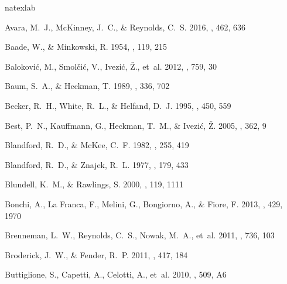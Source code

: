 \documentclass[preprint2,twocolappendix]{aastex6}
\begin{document}
\begin{thebibliography}{}
\expandafter\ifx\csname natexlab\endcsname\relax\def\natexlab#1{#1}\fi

{Avara}, M.~J., {McKinney}, J.~C., \& {Reynolds}, C.~S. 2016, \mnras, 462, 636

{Baade}, W., \& {Minkowski}, R. 1954, \apj, 119, 215

{Balokovi{\'c}}, M., {Smol{\v c}i{\'c}}, V., {Ivezi{\'c}}, {\v Z}., {et~al.}
  2012, \apj, 759, 30

{Baum}, S.~A., \& {Heckman}, T. 1989, \apj, 336, 702

{Becker}, R.~H., {White}, R.~L., \& {Helfand}, D.~J. 1995, \apj, 450, 559

{Best}, P.~N., {Kauffmann}, G., {Heckman}, T.~M., \& {Ivezi{\'c}}, {\v Z}.
  2005, \mnras, 362, 9

{Blandford}, R.~D., \& {McKee}, C.~F. 1982, \apj, 255, 419

{Blandford}, R.~D., \& {Znajek}, R.~L. 1977, \mnras, 179, 433

{Blundell}, K.~M., \& {Rawlings}, S. 2000, \aj, 119, 1111

{Bonchi}, A., {La Franca}, F., {Melini}, G., {Bongiorno}, A., \& {Fiore}, F.
  2013, \mnras, 429, 1970

{Brenneman}, L.~W., {Reynolds}, C.~S., {Nowak}, M.~A., {et~al.} 2011, \apj,
  736, 103

{Broderick}, J.~W., \& {Fender}, R.~P. 2011, \mnras, 417, 184

{Buttiglione}, S., {Capetti}, A., {Celotti}, A., {et~al.} 2010, \aap, 509, A6


\end{thebibliography}
\end{document}
